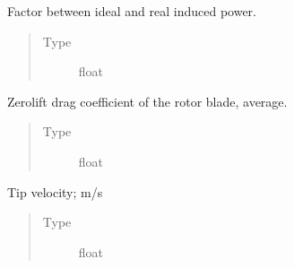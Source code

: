 \documentclass[letterpaper,10pt,english]{sphinxmanual}
\begin{document}
\begin{fulllineitems}
\begin{fulllineitems}
\begin{quote}
\begin{description}
\end{description}\end{quote}

\end{fulllineitems}


\begin{fulllineitems}
\label{\detokenize{modules/rotor:rotor.Rotor.kappa}}
\sphinxAtStartPar
Factor between ideal and real induced power.
\begin{quote}\begin{description}
\item[{Type}] \leavevmode
\sphinxAtStartPar
float

\end{description}\end{quote}

\end{fulllineitems}


\begin{fulllineitems}
\label{\detokenize{modules/rotor:rotor.Rotor.zero_lift_drag_coeff}}
\sphinxAtStartPar
Zero\sphinxhyphen{}lift drag coefficient of the rotor blade, average.
\begin{quote}\begin{description}
\item[{Type}] \leavevmode
\sphinxAtStartPar
float

\end{description}\end{quote}

\end{fulllineitems}


\begin{fulllineitems}
\label{\detokenize{modules/rotor:rotor.Rotor.tip_velocity}}
\sphinxAtStartPar
Tip velocity; m/s
\begin{quote}\begin{description}
\item[{Type}] \leavevmode
\sphinxAtStartPar
float


\end{description}
\end{quote}
\end{fulllineitems}
\end{fulllineitems}
\end{document}
